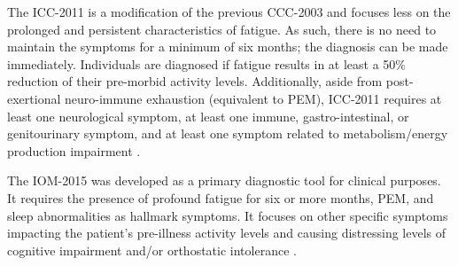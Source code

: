The ICC-2011 is a modification of the previous CCC-2003 and focuses less on the prolonged and persistent characteristics of fatigue. 
As such, there is no need to maintain the symptoms for a minimum of six months; the diagnosis can be made immediately.
Individuals are diagnosed if fatigue results in at least a 50\% reduction of their pre-morbid activity levels.
Additionally, aside from post-exertional neuro-immune exhaustion (equivalent to PEM), ICC-2011 requires at least one neurological symptom, at least one immune, gastro-intestinal, or genitourinary symptom, and at least one symptom related to metabolism/energy production impairment \citep{carruthers2011MyalgicEncephalomyelitis}.

The IOM-2015 was developed as a primary diagnostic tool for clinical purposes.
It requires the presence of profound fatigue for six or more months, PEM, and sleep abnormalities as hallmark symptoms.
It focuses on other specific symptoms impacting the patient's pre-illness activity levels and causing distressing levels of cognitive impairment and/or orthostatic intolerance \citep{instituteofmedicine2015MyalgicEncephalomyelitis}.

